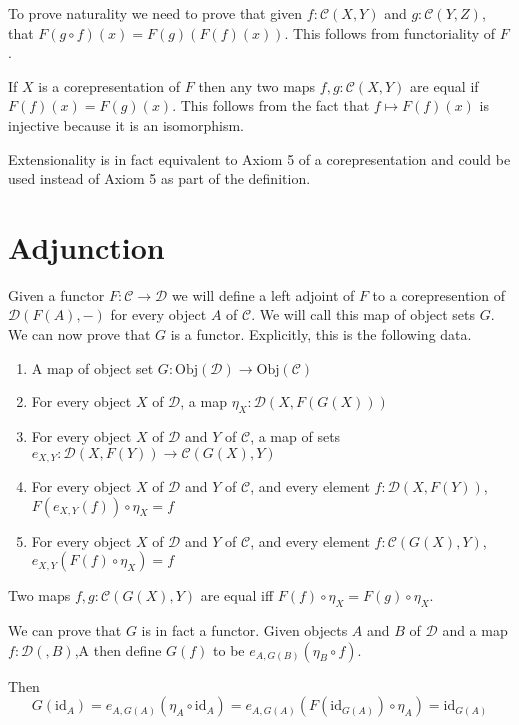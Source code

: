 \documentclass[12pt]{article} %
\theoremstyle{definition}
\theoremstyle{definition}
\theoremstyle{definition}
\theoremstyle{definition}
\begin{document}
To prove naturality we need to prove that given $f : \mathcal{C}(X, Y)$ and $g : \mathcal{C}(Y, Z)$,
that $F(g \circ f)(x) = F(g)(F(f)(x))$. This follows from functoriality of $F$.

If $X$ is a corepresentation of $F$ then any two maps $f, g : \mathcal{C}(X, Y)$ are equal
if $F(f)(x) = F(g)(x)$. This follows from the fact that $f \mapsto F(f)(x)$ is injective
because it is an isomorphism.

Extensionality is in fact equivalent to Axiom 5 of a corepresentation and could be used
instead of Axiom 5 as part of the definition.

\section{Adjunction}

Given a functor $F : \mathcal{C} \to \mathcal{D}$ we will define a left adjoint of $F$ to 
a corepresention of $\mathcal{D}(F(A),-)$ for every object $A$ of $\mathcal{C}$. We will call
this map of object sets $G$. We can now prove that $G$ is a functor. Explicitly,
this is the following data.

\begin{enumerate}
  \item A map of object set $G : \text{Obj}(\mathcal{D})\to \text{Obj}(\mathcal{C})$
  \item For every object $X$ of $\mathcal{D}$, a map $\eta_X : \mathcal{D}(X, F(G(X)))$
  \item For every object $X$ of $\mathcal{D}$ and $Y$ of $\mathcal{C}$, 
    a map of sets $e_{X,Y} : \mathcal{D}(X, F(Y)) \to \mathcal{C}(G(X), Y)$
  \item For every object $X$ of $\mathcal{D}$ and $Y$ of $\mathcal{C}$, 
    and every element $f : \mathcal{D}(X, F(Y))$, $F(e_{X,Y}(f)) \circ \eta_X = f$
  \item For every object $X$ of $\mathcal{D}$ and $Y$ of $\mathcal{C}$, 
  and every element $f : \mathcal{C}(G(X), Y)$, $e_{X,Y}(F(f) \circ \eta_X) = f$
\end{enumerate}


Two maps $f,g : \mathcal{C}(G(X), Y)$ are equal iff $F(f) \circ \eta_X = F(g) \circ \eta_X$.

We can prove that $G$ is in fact a functor. 
Given objects $A$ and $B$ of $\mathcal{D}$ and a map $f : \mathcal{D}(, B)$,A
then define $G(f)$ to be $e_{A,G(B)}(\eta_B \circ f)$.

Then 
\begin{equation}
  G(\text{id}_A) = e_{A,G(A)}(\eta_A \circ \text{id}_A) = 
e_{A,G(A)}(F (\text{id}_{G(A)}) \circ \eta_A) = \text{id}_{G(A)}
\end{equation}
\end{document}
